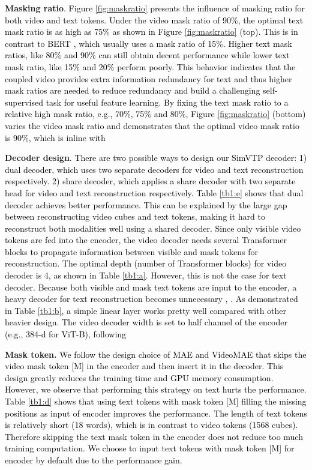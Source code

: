 \documentclass[10pt,twocolumn,letterpaper]{article}
\newcommand{\yty}[1]{\textcolor{black}{#1}}
\begin{document}
\noindent\textbf{Masking ratio}.
\yty{Figure \ref{fig:maskratio} presents the influence of masking ratio for both video and text tokens.  Under the video mask ratio of 90\%, the optimal text mask ratio is as high as 75\% as shown in Figure \ref{fig:maskratio} (top). This is in contrast to BERT \cite{devlin2018bert}, which usually uses a mask ratio of 15\%.  Higher text mask ratios, like 80\% and 90\% can still obtain decent performance while lower text mask ratio, like 15\% and 20\% perform poorly. This behavior indicates that the coupled video provides extra information redundancy for text and thus higher mask ratios are needed to reduce redundancy and build a challenging self-supervised task for useful feature learning. By fixing the text mask ratio to a relative high mask ratio, e.g., 70\%, 75\% and 80\%, Figure \ref{fig:maskratio} (bottom) varies the video mask ratio and demonstrates that the optimal video mask ratio is 90\%, which is inline with \cite{tong2022videomae}}



\noindent\textbf{Decoder design}. 
\yty{There are two possible ways to design our SimVTP decoder: 1) dual decoder, which uses two separate decoders for video and text reconstruction respectively. 2) share decoder, which applies a share decoder with two separate head for video and text reconstruction respectively.  Table \ref{tb1:e} shows that dual decoder achieves better performance. This can be explained by the large gap between reconstructing video cubes and text tokens, making it hard to reconstruct both modalities well using a shared decoder. Since only visible video tokens are fed into the encoder, the video decoder needs several Transformer blocks to propagate information between visible and mask tokens for reconstruction. The optimal depth (number of Transformer blocks) for video decoder is 4, as shown in Table \ref{tb1:a}. However, this is not the case for text decoder. Because both visible and mask text tokens are input to the encoder, a heavy decoder for text reconstruction becomes unnecessary \cite{devlin2018bert, xie2022simmim}, . As demonstrated in Table \ref{tb1:b}, a simple linear layer works pretty well compared with other heavier design. The video decoder width is set to half channel of the encoder (e.g., 384-d for ViT-B), following \cite{tong2022videomae}}



\noindent\textbf{Mask token.}
\yty{We follow the design choice of MAE \cite{he2022masked} and VideoMAE \cite{tong2022videomae} that skips the video mask token [M] in the encoder and then insert it in the decoder. This design greatly reduces the training time and GPU memory consumption. However, we observe that performing this strategy on text hurts the performance. Table \ref{tb1:d} shows that using text tokens with mask token [M] filling the missing positions as input of encoder improves the performance. The length of text tokens is relatively short (18 words), which is in contrast to video tokens (1568 cubes). Therefore skipping the text mask token in the encoder does not reduce too much training computation. We choose to input text tokens with mask token [M] for encoder by default due to the performance gain.}
\end{document}
